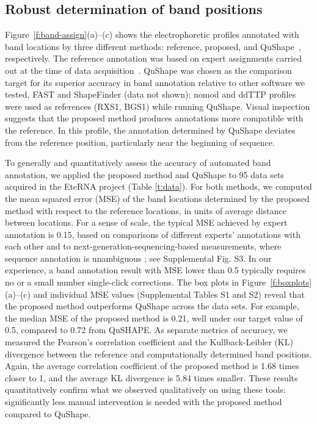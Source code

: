 \newcommand{\bP}{{\mathbf{P}}}

\subsection{Robust determination of band positions}\label{ss:band-position}
Figure~\ref{f:band-assign}(a)--(c) shows the electrophoretic profiles annotated with band locations by three different methods: reference, proposed, and QuShape~\citep{Karabiber2013}, respectively. The reference annotation was based on expert assignments carried out at the time of data acquisition~\citep{lee2014eterna}. QuShape was chosen as the comparison target for its superior accuracy in band annotation relative to other software we tested, FAST and ShapeFinder (data not shown); nomod and ddTTP profiles were used as references (RXS1, BGS1) while running QuShape. Visual inspection suggests that the proposed method produces annotations more compatible with the reference. In this profile, the annotation determined by QuShape deviates from the reference position, particularly near the beginning of sequence.

To generally and quantitatively assess the accuracy of automated band annotation, we applied the proposed method and QuShape to 95 data sets acquired in the EteRNA project (Table \ref{t:data}). For both methods, we computed the mean squared error (MSE) of the band locations determined by the proposed method with respect to the reference locations, in units of average distance between locations. For a sense of scale, the typical MSE achieved by expert annotation is 0.15, based on comparisons of different experts' annotations with each other and to next-generation-sequencing-based measurements, where sequence annotation is unambiguous \citep{Kladwang2014}; see Supplemental Fig. S3. In our experience, a band annotation result with MSE lower than 0.5 typically requires no or a small number single-click corrections. The box plots in Figure~\ref{f:boxplots}(a)--(c) and individual MSE values (Supplemental Tables S1 and S2) reveal that the proposed method outperforms QuShape across the data sets. For example, the median MSE of the proposed method is 0.21, well under our target value of 0.5, compared to 0.72 from QuSHAPE. As separate metrics of accuracy, we measured the Pearson's correlation coefficient and the Kullback-Leibler (KL) divergence between the reference and computationally determined band positions.  Again, the average correlation coefficient of the proposed method is 1.68 times closer to 1, and the average KL divergence is 5.84 times smaller. These results quantitatively confirm what we observed qualitatively on using these tools: significantly less manual intervention is needed with the proposed method compared to QuShape. 

